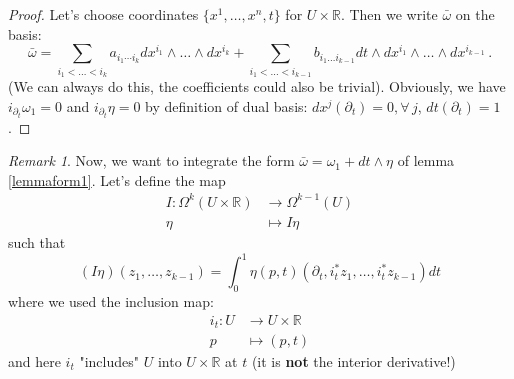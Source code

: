 \documentclass[a4paper,11pt,titlepage, article, oneside]{memoir}
\numberwithin{equation}{section}
\theoremstyle{definition}
\theoremstyle{remark}
\newtheorem{remark}[theorem]{Remark}
\newcommand{\rfield}{\mathbb{R}}
\begin{document}
\begin{proof}
  Let's choose coordinates $\{x^1, \ldots, x^n, t\}$ for $U \times \rfield$. Then we write $\bar \omega$ on the basis:
  $$\bar \omega = \sum\limits_{i_1 < \ldots < i_k} a_{i_1 \cdots i_k} dx^{i_1} \wedge \ldots \wedge dx^{i_k} + \sum_{i_1 < \ldots < i_{k-1}} b_{i_1 \ldots i_{k-1}} dt \wedge dx^{i_1} \wedge \ldots \wedge dx^{i_{k-1}} \, .$$
  (We can always do this, the coefficients could also be trivial). Obviously, we have $i_{\partial_t} \omega_1 = 0$ and $i_{\partial_t} \eta = 0$ by definition of dual basis: $dx^{j} (\partial_t) = 0, \forall \, j$, $dt(\partial_t) = 1$.
\end{proof}

\begin{remarkbox} \begin{remark} \label{intremark}
Now, we want to integrate the form $\bar \omega = \omega_1 + dt \wedge \eta$ of lemma \ref{lemmaform1}.
Let's define the map
  \begin{align}
    I \colon \Omega^k(U \times \rfield) &\rightarrow \Omega^{k-1}(U) \\
    \eta &\mapsto I\eta \nonumber
  \end{align}
  such that $$(I\eta)(z_1, \ldots, z_{k-1}) = \int_0^1 \eta(p, t)(\partial_t, i_{t}^*z_1, \ldots, i_{t}^*z_{k-1})dt$$
where we used the inclusion map:
  \begin{align} \label{definclusion}
    i_t \colon U &\rightarrow U \times \rfield \\
    p &\mapsto (p, t) \nonumber
  \end{align}
  and here $i_t$ "includes" $U$ into $U \times \rfield$ at $t$ (it is \textbf{not} the interior derivative!)
\end{remark}\end{remarkbox}
\end{document}

